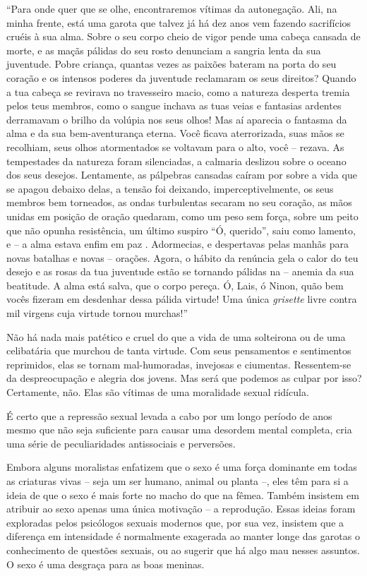 ``Para onde quer que se olhe, encontraremos vítimas da autonegação. Ali,
na minha frente, está uma garota que talvez já há dez anos vem fazendo
sacrifícios cruéis à sua alma. Sobre o seu corpo cheio de vigor pende
uma cabeça cansada de morte, e as maçãs pálidas do seu rosto denunciam a
sangria lenta da sua juventude. Pobre criança, quantas vezes as paixões
bateram na porta do seu coração e os intensos poderes da juventude
reclamaram os seus direitos? Quando a tua cabeça se revirava no
travesseiro macio, como a natureza desperta tremia pelos teus membros,
como o sangue inchava as tuas veias e fantasias ardentes derramavam o
brilho da volúpia nos seus olhos! Mas aí aparecia o fantasma da alma e
da sua bem-aventurança eterna. Você ficava aterrorizada, suas mãos se
recolhiam, seus olhos atormentados se voltavam para o alto, você --
rezava. As tempestades da natureza foram silenciadas, a calmaria
deslizou sobre o oceano dos seus desejos. Lentamente, as pálpebras
cansadas caíram por sobre a vida que se apagou debaixo delas, a tensão
foi deixando, imperceptivelmente, os seus membros bem torneados, as
ondas turbulentas secaram no seu coração, as mãos unidas em posição de
oração quedaram, como um peso sem força, sobre um peito que não opunha
resistência, um último suspiro ``Ó, querido'', saiu como lamento, e -- a
alma estava enfim em paz . Adormecias, e despertavas pelas manhãs para
novas batalhas e novas -- orações. Agora, o hábito da renúncia gela o
calor do teu desejo e as rosas da tua juventude estão se tornando
pálidas na -- anemia da sua beatitude. A alma está salva, que o corpo
pereça. Ó, Lais, ó Ninon, quão bem vocês fizeram em desdenhar dessa
pálida virtude! Uma única \emph{grisette} livre contra mil virgens cuja
virtude tornou murchas!''

Não há nada mais patético e cruel do que a vida de uma solteirona ou de
uma celibatária que murchou de tanta virtude. Com seus pensamentos e
sentimentos reprimidos, elas se tornam mal-humoradas, invejosas e
ciumentas. Ressentem-se da despreocupação e alegria dos jovens. Mas será
que podemos as culpar por isso? Certamente, não. Elas são vítimas de uma
moralidade sexual ridícula.

É certo que a repressão sexual levada a cabo por um longo período de
anos mesmo que não seja suficiente para causar uma desordem mental
completa, cria uma série de peculiaridades antissociais e perversões.

Embora alguns moralistas enfatizem que o sexo é uma força dominante em
todas as criaturas vivas -- seja um ser humano, animal ou planta --,
eles têm para si a ideia de que o sexo é mais forte no macho do que na
fêmea. Também insistem em atribuir ao sexo apenas uma única motivação --
a reprodução. Essas ideias foram exploradas pelos psicólogos sexuais
modernos que, por sua vez, insistem que a diferença em intensidade é
normalmente exagerada ao manter longe das garotas o conhecimento de
questões sexuais, ou ao sugerir que há algo mau nesses assuntos. O sexo
é uma desgraça para as boas meninas.

